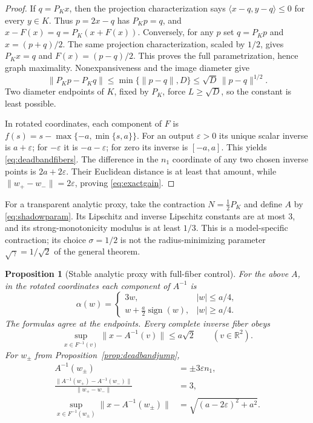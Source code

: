 \documentclass[11pt]{article}
\numberwithin{equation}{section}
\newtheorem{proposition}[theorem]{Proposition}
\theoremstyle{definition}
\theoremstyle{remark}
\newcommand{\R}{\mathbb R}
\newcommand{\ip}[2]{\langle #1,#2\rangle}
\newcommand{\norm}[1]{\lVert #1\rVert}
\newcommand{\eps}{\varepsilon}
\begin{document}
\begin{proof}
If $q=P_Kx$, then the projection characterization says
$\ip{x-q}{y-q}\le0$ for every $y\in K$. Thus
$p=2x-q$ has $P_Kp=q$, and
$x-F(x)=q=P_K(x+F(x))$. Conversely, for any $p$ set
$q=P_Kp$ and $x=(p+q)/2$. The same projection characterization,
scaled by $1/2$, gives $P_Kx=q$ and $F(x)=(p-q)/2$.
This proves the full parametrization, hence graph maximality.
Nonexpansiveness and the image diameter give
\[
 \norm{P_Kp-P_Kq}\le\min\{\norm{p-q},D\}
 \le\sqrt D\,\norm{p-q}^{1/2}.
\]
Two diameter endpoints of $K$, fixed by $P_K$, force
$L\ge\sqrt D$, so the constant is least possible.

In rotated coordinates, each component of $F$ is
$f(s)=s-\max\{-a,\min\{s,a\}\}$. For an output $\eps>0$ its
unique scalar inverse is $a+\eps$; for $-\eps$ it is $-a-\eps$;
for zero its inverse is $[-a,a]$. This yields
\eqref{eq:deadbandfibers}. The difference in the $n_1$ coordinate
of any two chosen inverse points is $2a+2\eps$. Their Euclidean
distance is at least that amount, while
$\norm{w_+-w_-}=2\eps$, proving \eqref{eq:exactgain}.
\end{proof}

For a transparent analytic proxy, take the contraction
$N=\tfrac12 P_K$ and define $A$ by \eqref{eq:shadowparam}. Its
Lipschitz and inverse Lipschitz constants are at most $3$, and its
strong-monotonicity modulus is at least $1/3$.
This is a model-specific contraction; its choice $\sigma=1/2$ is not
the radius-minimizing parameter $\sqrt\gamma=1/\sqrt2$ of the
general theorem.

\begin{proposition}[Stable analytic proxy with full-fiber control]
\label{prop:deadbandproxy}
For the above $A$, in the rotated coordinates each component of
$A^{-1}$ is
\begin{equation}\label{eq:deadbandproxyformula}
 \alpha(w)=
 \begin{cases}
 3w,& |w|\le a/4,\\
 w+\tfrac a2\operatorname{sign}(w),& |w|\ge a/4.
 \end{cases}
\end{equation}
The formulas agree at the endpoints. Every complete inverse fiber obeys
\begin{equation}\label{eq:deadbandglobaltube}
 \sup_{x\in F^{-1}(v)}\norm{x-A^{-1}(v)}\le a\sqrt2
 \qquad(v\in\R^2).
\end{equation}
For $w_\pm$ from Proposition~\ref{prop:deadbandjump},
\begin{align}
 A^{-1}(w_\pm)&=\pm3\eps n_1,\label{eq:proxygain1}\\
 \frac{\norm{A^{-1}(w_+)-A^{-1}(w_-)}}
      {\norm{w_+-w_-}}&=3,\label{eq:proxygain2}\\
 \sup_{x\in F^{-1}(w_\pm)}\norm{x-A^{-1}(w_\pm)}
 &=\sqrt{(a-2\eps)^2+a^2}.\label{eq:proxyerror}
\end{align}
\end{proposition}
\end{document}
